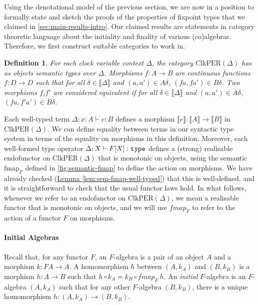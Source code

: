 \documentclass[natbib]{sigplanconf}
\newcommand{\sem}[1]{\llbracket #1 \rrbracket}
\newcommand{\sortType}{\texttt{\textup{type}}}
\newcommand{\ClkPER}{\mathrm{ClkPER}}
\newtheorem{definition}{Definition}
\newcommand{\lemref}[1]{\hyperref[#1]{Lemma \ref*{#1}}}
\begin{document}
Using the denotational model of the previous section, we are now in a
position to formally state and sketch the proofs of the properties of
fixpoint types that we claimed in
\autoref{sec:main-results-intro}. Our claimed results are statements
in category theoretic language about the initiality and finality of
various (co)algebras. Therefore, we first construct suitable
categories to work in.

\begin{definition}
  For each clock variable context $\Delta$, the category
  $\ClkPER(\Delta)$ has as objects semantic types over
  $\Delta$. Morphisms $f : A \to B$ are continuous functions $f : D
  \to D$ such that for all $\delta \in \sem{\Delta}$ and $(a,a') \in
  A\delta$, $(fa, fa') \in B\delta$. Two morphisms $f$,$f'$ are
  considered equivalent if for all $\delta \in \sem{\Delta}$ and
  $(a,a') \in A\delta$, $(fa, f'a') \in B\delta$.
\end{definition}

Each well-typed term $\Delta; x : A \vdash e : B$ defines a morphism
$\sem{e} : \sem{A} \to \sem{B}$ in $\ClkPER(\Delta)$. We can define
equality between terms in our syntactic type system in terms of the
equality on morphisms in this definition. Moreover, each well-formed
type operator $\Delta; X \vdash F[X] : \sortType$ defines a (strong)
realisable endofunctor on $\ClkPER(\Delta)$ that is monotonic on
objects, using the semantic $\mathrm{fmap}_F$ defined in
\autoref{fig:semantic-fmap} to define the action on morphisms. We have
already checked (\lemref{lem:sem-fmap-well-typed}) that this is
well-defined, and it is straightforward to check that the usual
functor laws hold. In what follows, whenever we refer to an
endofunctor on $\ClkPER(\Delta)$, we mean a realisable functor that is
monotonic on objects, and we will use $\mathit{fmap}_F$ to refer to
the action of a functor $F$ on morphisms.

\paragraph{Initial Algebras} Recall that, for any functor $F$, an
$F$-algebra is a pair of an object $A$ and a morphism $k : FA \to
A$. A homomorphism $h$ between $(A,k_A)$ and
$(B,k_B)$ is a morphism $h : A \to B$ such that $h \circ k_A = k_B
\circ \mathit{fmap}_F~h$. An \emph{initial} $F$-algebra is an
$F$-algebra $(A,k_A)$ such that for any other $F$-algebra $(B,k_B)$,
there is a unique homomorphism $h : (A,k_A) \to (B,k_B)$.
\end{document}
